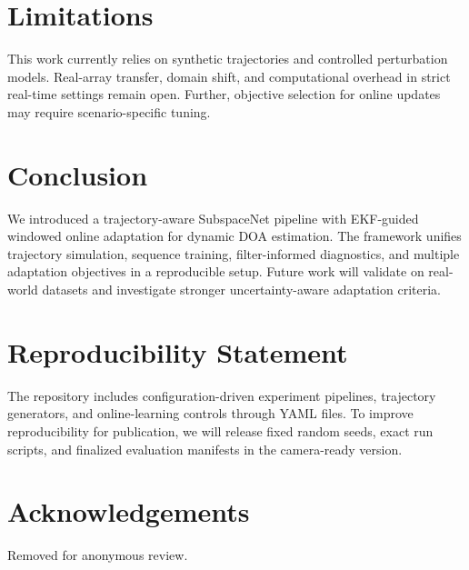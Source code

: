 \documentclass{article}
\begin{document}
\section{Limitations}
This work currently relies on synthetic trajectories and controlled perturbation models.
Real-array transfer, domain shift, and computational overhead in strict real-time settings remain open.
Further, objective selection for online updates may require scenario-specific tuning.

\section{Conclusion}
We introduced a trajectory-aware SubspaceNet pipeline with EKF-guided windowed online adaptation for dynamic DOA estimation.
The framework unifies trajectory simulation, sequence training, filter-informed diagnostics, and multiple adaptation objectives in a reproducible setup.
Future work will validate on real-world datasets and investigate stronger uncertainty-aware adaptation criteria.

\section*{Reproducibility Statement}
The repository includes configuration-driven experiment pipelines, trajectory generators, and online-learning controls through YAML files.
To improve reproducibility for publication, we will release fixed random seeds, exact run scripts, and finalized evaluation manifests in the camera-ready version.

\section*{Acknowledgements}
Removed for anonymous review.



\end{document}
